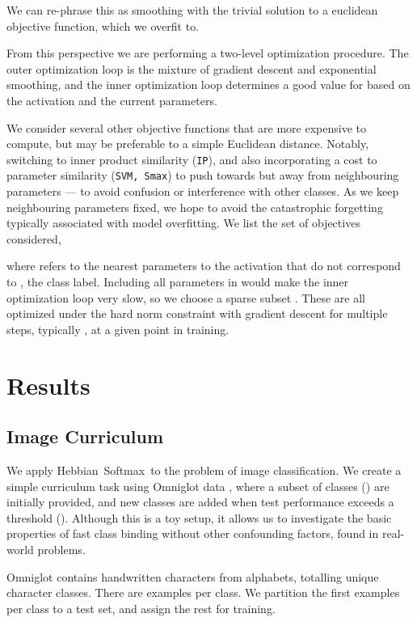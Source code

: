 \documentclass{article} \usepackage{hyperref}
\newcommand{\model}{\hbox{Hebbian Softmax }}
\begin{document}
We can re-phrase this as smoothing  with the trivial solution to a euclidean objective function, which we overfit to. 

From this perspective we are performing a two-level optimization procedure. The outer optimization loop is the mixture of gradient descent and exponential smoothing, and the inner optimization loop determines a good value for  based on the activation  and the current parameters.

We consider several other objective functions that are more expensive to compute, but may be preferable to a simple Euclidean distance. Notably, switching to inner product similarity (\texttt{IP}), and also incorporating a cost to parameter similarity (\texttt{SVM, Smax}) to push  towards  but away from neighbouring parameters --- to avoid confusion or interference with other classes. As we keep neighbouring parameters fixed, we hope to avoid the catastrophic forgetting typically associated with model overfitting. We list the set of objectives considered,

where  refers to the  nearest parameters to the activation  that do not correspond to , the class label. Including all  parameters in  would make the inner optimization loop very slow, so we choose a sparse subset . These are all optimized under the hard norm constraint  with gradient descent for multiple steps, typically , at a given point in training. 

\section{Results}
\subsection{Image Curriculum}

We apply \model to the problem of image classification. We create a simple curriculum task using Omniglot data \cite{lake2015human}, where a subset of classes () are initially provided, and  new classes are added when test performance exceeds a threshold (). Although this is a toy setup, it allows us to investigate the basic properties of fast class binding without other confounding factors, found in real-world problems.

Omniglot contains handwritten characters from  alphabets, totalling  unique character classes. There are  examples per class. We partition the first  examples per class to a test set, and assign the rest for training.
\end{document}

